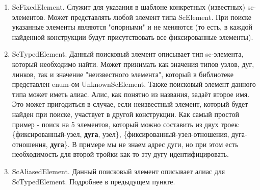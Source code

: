 \begin{itemize}
\begin{enumerate}
\item ScFixedElement. Служит для указания в шаблоне конкретных (известных) sc-элементов. Может представлять любой элемент типа ScElement. При поиске указанные элементы являются "опорными" и не меняются (то есть, в каждой найденной конструкции будут присутствовать все фиксированные элементы).
\item ScTypedElement. Данный поисковый элемент описывает тип sc-элемента, который необходимо найти. Может принимать как значения типов узлов, дуг, линков, так и значение "неизвестного элемента", который в библиотеке представлен enum-ом UnknownScElement. Также поисковый элемент данного типа может иметь алиас. Алис, как понятно из названия, задаёт второе имя. Это может пригодиться в случае, если неизвестный элемент, который будет найден при поиске, участвует в другой конструкции. Как самый простой пример - поиск на 5 элементов, который можно составить из двух троек: \{фиксированный-узел, \textbf{дуга}, узел\}, \{фиксированный-узел-отношения, дуга-отношения, \textbf{дуга}\}. В примере мы не знаем адрес дуги, но при этом есть необходимость для второй тройки как-то эту дугу идентифицировать. 
\item ScAliasedElement. Данный поисковый элемент описывает алиас для ScTypedElement. Подробнее в предыдущем пункте. 
\end{enumerate}
\end{itemize}

